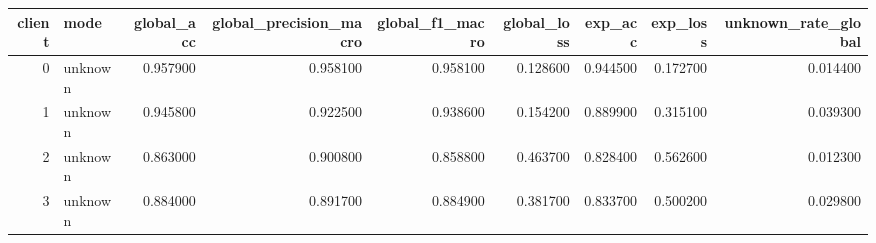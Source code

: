 \begin{tabular}{rlrrrrrrr}
\toprule
client & mode & global_acc & global_precision_macro & global_f1_macro & global_loss & exp_acc & exp_loss & unknown_rate_global \\
\midrule
0 & unknown & 0.957900 & 0.958100 & 0.958100 & 0.128600 & 0.944500 & 0.172700 & 0.014400 \\
1 & unknown & 0.945800 & 0.922500 & 0.938600 & 0.154200 & 0.889900 & 0.315100 & 0.039300 \\
2 & unknown & 0.863000 & 0.900800 & 0.858800 & 0.463700 & 0.828400 & 0.562600 & 0.012300 \\
3 & unknown & 0.884000 & 0.891700 & 0.884900 & 0.381700 & 0.833700 & 0.500200 & 0.029800 \\
\bottomrule
\end{tabular}
